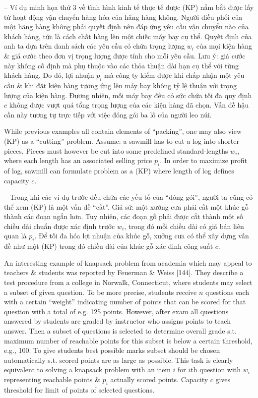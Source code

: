 \documentclass{article}
\begin{document}
\begin{itemize}
\begin{itemize}
        -- Ví dụ minh họa thứ 3 về tình hình kinh tế thực tế được (KP) nắm bắt được lấy từ hoạt động vận chuyển hàng hóa của hãng hàng không. Người điều phối của một hãng hàng không phải quyết định nên đáp ứng yêu cầu vận chuyển nào của khách hàng, tức là cách chất hàng lên một chiếc máy bay cụ thể. Quyết định của anh ta dựa trên danh sách các yêu cầu có chứa trọng lượng $w_i$ của mọi kiện hàng \& giá cước theo đơn vị trọng lượng được tính cho mỗi yêu cầu. Lưu ý: giá cước này không cố định mà phụ thuộc vào các thỏa thuận dài hạn cụ thể với từng khách hàng. Do đó, lợi nhuận $p_i$ mà công ty kiếm được khi chấp nhận một yêu cầu \& khi đặt kiện hàng tương ứng lên máy bay không tỷ lệ thuận với trọng lượng của kiện hàng. Đương nhiên, mỗi máy bay đều có sức chứa tối đa quy định $c$ không được vượt quá tổng trọng lượng của các kiện hàng đã chọn. Vấn đề hậu cần này tương tự trực tiếp với việc đóng gói ba lô của người leo núi.
        
        While previous examples all contain elements of ``packing'', one may also view (KP) as a ``cutting'' problem. Assume: a sawmill has to cut a log into shorter pieces. Pieces must however be cut into some predefined standard-lengths $w_i$, where each length has an associated selling price $p_i$. In order to maximize profit of log, sawmill can formulate problem as a (KP) where length of log defines capacity $c$.
        
        -- Trong khi các ví dụ trước đều chứa các yếu tố của ``đóng gói'', người ta cũng có thể xem (KP) là một vấn đề ``cắt''. Giả sử: một xưởng cưa phải cắt một khúc gỗ thành các đoạn ngắn hơn. Tuy nhiên, các đoạn gỗ phải được cắt thành một số chiều dài chuẩn được xác định trước $w_i$, trong đó mỗi chiều dài có giá bán liên quan là $p_i$. Để tối đa hóa lợi nhuận của khúc gỗ, xưởng cưa có thể xây dựng vấn đề như một (KP) trong đó chiều dài của khúc gỗ xác định công suất $c$.
        
        An interesting example of knapsack problem from academia which may appeal to teachers \& students was reported by Feuerman \& Weiss [144]. They describe a test procedure from a college in Norwalk, Connecticut, where students may select a subset of given question. To be more precise, students receive $n$ questions each with a certain ``weight'' indicating number of points that can be scored for that question with a total of e.g. 125 points. However, after exam all questions answered by students are graded by instructor who assigns points to teach answer. Then a subset of questions is selected to determine overall grade s.t. maximum number of reachable points for this subset is below a certain threshold, e.g., 100. To give students best possible marks subset should be chosen automatically s.t. scored points are as large as possible. This task is clearly equivalent to solving a knapsack problem with an item $i$ for $i$th question with $w_i$ representing reachable points \& $p_i$ actually scored points. Capacity $c$ gives threshold for limit of points of selected questions.
        

\end{itemize}
\end{itemize}
\end{document}
